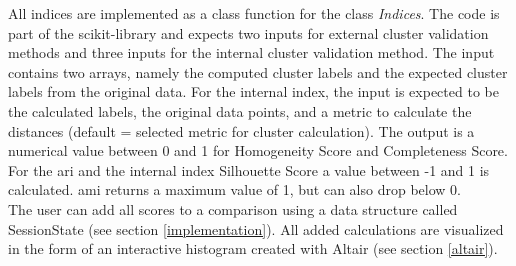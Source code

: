All indices are implemented as a class function for the class \textit{Indices}. The code is part of the scikit-library \cite{scikitlearn} and expects two inputs for external cluster validation methods and three inputs for the internal cluster validation method. The input contains two arrays, namely the computed cluster labels and the expected cluster labels from the original data. For the internal index, the input is expected to be the calculated labels, the original data points, and a metric to calculate the distances (default = selected metric for cluster calculation). The output is a numerical value between 0 and 1 for Homogeneity Score and Completeness Score. For the \acrfull{ari} and the internal index Silhouette Score a value between -1 and 1 is calculated. \acrfull{ami} returns a maximum value of 1, but can also drop below 0.\\
The user can add all scores to a comparison using a data structure called SessionState (see section \ref{implementation}). All added calculations are visualized in the form of an interactive histogram created with Altair (see section \ref{altair}). 